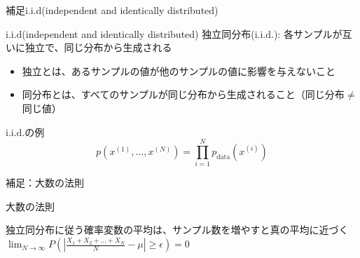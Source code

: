 \begin{frame}{補足i.i.d(independent and identically distributed)}
    \begin{block}{i.i.d(independent and identically distributed)}
        独立同分布(i.i.d.): 各サンプルが互いに独立で、同じ分布から生成される
        \begin{itemize}
            \item 独立とは、あるサンプルの値が他のサンプルの値に影響を与えないこと
            \item 同分布とは、すべてのサンプルが同じ分布から生成されること（同じ分布$\neq$同じ値）
        \end{itemize}
    \end{block}
    \begin{block}{i.i.d.の例}
        \[
            p(x^{(1)},\ldots,x^{(N)})
            =\prod_{i=1}^{N}p_{\mathrm{data}}(x^{(i)})
        \]
    \end{block}
\end{frame}
\begin{frame}{補足：大数の法則}
    \begin{block}{大数の法則}

        独立同分布に従う確率変数の平均は、サンプル数を増やすと真の平均に近づく\\

        \centering$\lim_{N\to\infty}P(|\frac{X_{1}+X_{2}+...+X_{N}}{N}-\mu|\geq \epsilon)=0$
    \end{block}
\end{frame}
